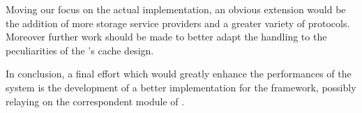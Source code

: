 Moving our focus on the actual implementation, an obvious extension
would be the addition of more \cloud storage service
providers and a greater variety of \peersampling protocols. Moreover
further work should be made to better adapt the
\cloud \descriptors handling to the peculiarities of the \grapes's
cache design.

In conclusion, a final effort which would greatly enhance
the performances of the system is the development of a better \networkhelper
implementation for the \cloudypeer framework, possibly relaying on the
correspondent module of \grapes.
